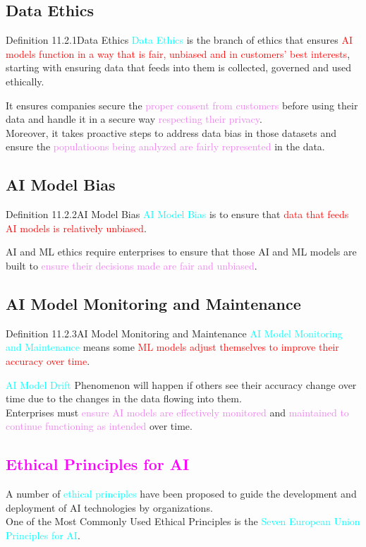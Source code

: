 \documentclass{book}
\begin{document}
\subsection{Data Ethics}
\begin{defBox}{Definition 11.2.1}{Data Ethics}
    \textcolor{cyan}{Data Ethics} is the branch of ethics that ensures \textcolor{red}{AI models function in a way that is fair, unbiased and in customers' best interests}, starting with ensuring data that feeds into them is collected, governed and used ethically.
\end{defBox}
It ensures companies secure the \textcolor{violet}{proper consent from customers} before using their data and handle it in a secure way \textcolor{violet}{respecting their privacy}.\\
Moreover, it takes proactive steps to address data bias in those datasets and ensure the \textcolor{violet}{populatioons being analyzed are fairly represented} in the data.\\
\subsection{AI Model Bias}
\begin{defBox}{Definition 11.2.2}{AI Model Bias}
    \textcolor{cyan}{AI Model Bias} is to ensure that \textcolor{red}{data that feeds AI models is relatively unbiased}.
\end{defBox}
AI and ML ethics require enterprises to ensure that those AI and ML models are built to \textcolor{violet}{ensure their decisions made are fair and unbiased}.\\
\subsection{AI Model Monitoring and Maintenance}
\begin{defBox}{Definition 11.2.3}{AI Model Monitoring and Maintenance}
    \textcolor{cyan}{AI Model Monitoring and Maintenance} means some \textcolor{red}{ML models adjust themselves to improve their accuracy over time}.
\end{defBox}
\textcolor{cyan}{AI Model Drift} Phenomenon will happen if others see their accuracy change over time due to the changes in the data flowing into them.\\
Enterprises must \textcolor{violet}{ensure AI models are effectively monitored} and \textcolor{violet}{maintained to continue functioning as intended} over time.\\
\textcolor{magenta}{\section{\textbf{Ethical Principles for AI}}}
A number of \textcolor{cyan}{ethical principles} have been proposed to guide the development and deployment of AI technologies by organizations.\\
One of the Most Commonly Used Ethical Principles is the \textcolor{cyan}{Seven European Union Principles for AI}.\\
\vspace{2mm}
\end{document}
